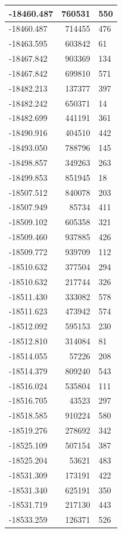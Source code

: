 \documentclass[]{book}
\theoremstyle{definition}
\theoremstyle{definition}
\theoremstyle{definition}
\theoremstyle{remark}
\begin{document}
\begin{tabular}{l|r|l}
-18460.487 & 760531 & 550\\
\hline
-18460.487 & 714455 & 476\\
\hline
-18463.595 & 603842 & 61\\
\hline
-18467.842 & 903369 & 134\\
\hline
-18467.842 & 699810 & 571\\
\hline
-18482.213 & 137377 & 397\\
\hline
-18482.242 & 650371 & 14\\
\hline
-18482.699 & 441191 & 361\\
\hline
-18490.916 & 404510 & 442\\
\hline
-18493.050 & 788796 & 145\\
\hline
-18498.857 & 349263 & 263\\
\hline
-18499.853 & 851945 & 18\\
\hline
-18507.512 & 840078 & 203\\
\hline
-18507.949 & 85734 & 411\\
\hline
-18509.102 & 605358 & 321\\
\hline
-18509.460 & 937885 & 426\\
\hline
-18509.772 & 939709 & 112\\
\hline
-18510.632 & 377504 & 294\\
\hline
-18510.632 & 217744 & 326\\
\hline
-18511.430 & 333082 & 578\\
\hline
-18511.623 & 473942 & 574\\
\hline
-18512.092 & 595153 & 230\\
\hline
-18512.810 & 314084 & 81\\
\hline
-18514.055 & 57226 & 208\\
\hline
-18514.379 & 809240 & 543\\
\hline
-18516.024 & 535804 & 111\\
\hline
-18516.705 & 43523 & 297\\
\hline
-18518.585 & 910224 & 580\\
\hline
-18519.276 & 278692 & 342\\
\hline
-18525.109 & 507154 & 387\\
\hline
-18525.204 & 53621 & 483\\
\hline
-18531.309 & 173191 & 422\\
\hline
-18531.340 & 625191 & 350\\
\hline
-18531.719 & 217130 & 443\\
\hline
-18533.259 & 126371 & 526\\

\end{tabular}
\end{document}
